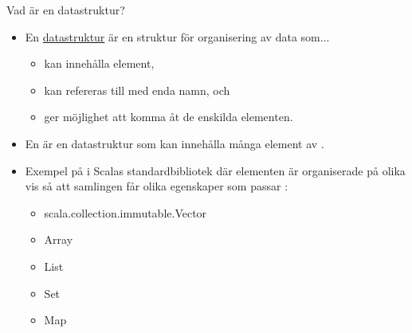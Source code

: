 
\ifkompendium\else

\begin{Slide}{Vad är en datastruktur?}\SlideFontSmall
\begin{itemize}
\item En \href{https://sv.wikipedia.org/wiki/Datastruktur}{datastruktur} är en struktur för organisering av data som...
\begin{itemize}\SlideFontTiny
\item kan innehålla  element,
\item kan refereras till med  enda namn, och
\item ger möjlighet att komma åt de enskilda elementen.
\end{itemize}

\item En   är en datastruktur som kan innehålla många element av .

\item Exempel på  i Scalas standardbibliotek där elementen är organiserade på olika vis så att samlingen får olika egenskaper som passar : 
\begin{itemize}\SlideFontTiny
\item scala.collection.immutable.Vector
\item Array
\item List
\item Set
\item Map
\end{itemize}

\end{itemize}

\end{Slide} 

\fi


